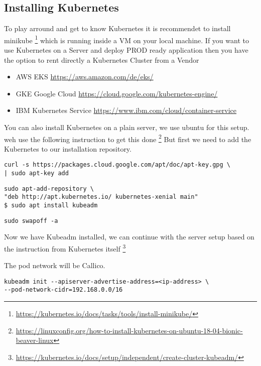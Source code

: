 \subsection{Installing Kubernetes}


To play arround and get to know Kubernetes it is recommendet to install minikube \footnote{\url{https://kubernetes.io/docs/tasks/tools/install-minikube/}} which is running inside a VM on your local machine.
If you want to use Kubernetes on a Server and deploy PROD ready application then you have the option to rent directly a Kubernetes Cluster from a Vendor
\begin{itemize}
\item AWS EKS \url{https://aws.amazon.com/de/eks/}
\item GKE Google Cloud \url{https://cloud.google.com/kubernetes-engine/}
\item IBM Kubernetes Service \url{https://www.ibm.com/cloud/container-service}
\end{itemize}

You can also install Kubernetes on a plain server, we use ubuntu for this setup. weh use the following instruction to get this done \footnote{\url{https://linuxconfig.org/how-to-install-kubernetes-on-ubuntu-18-04-bionic-beaver-linux}}
 But first we need to add the Kubernetes to our installation repository.
\begin{verbatim}
curl -s https://packages.cloud.google.com/apt/doc/apt-key.gpg \ 
| sudo apt-key add
\end{verbatim}

\begin{verbatim}
sudo apt-add-repository \
"deb http://apt.kubernetes.io/ kubernetes-xenial main"
$ sudo apt install kubeadm 
\end{verbatim}

\begin{verbatim}
sudo swapoff -a
\end{verbatim}

Now we have Kubeadm installed, we can continue with the server setup based on the instruction from Kubernetes itself \footnote{\url{https://kubernetes.io/docs/setup/independent/create-cluster-kubeadm/}}

The pod network will be Callico.

\begin{verbatim}
kubeadm init --apiserver-advertise-address=<ip-address> \
--pod-network-cidr=192.168.0.0/16
\end{verbatim}

